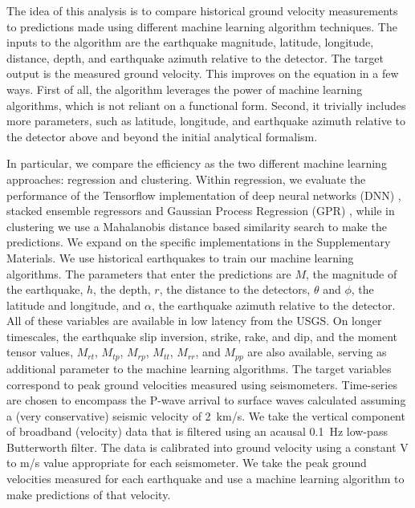 \documentclass[preprint, aps, showpacs]{revtex4-1}
\begin{document}
The idea of this analysis is to compare historical ground velocity measurements to predictions made using different machine learning algorithm techniques. 
The inputs to the algorithm are the earthquake magnitude, latitude, longitude, distance, depth, and earthquake azimuth relative to the detector. 
The target output is the measured ground velocity.
This improves on the equation in a few ways.
First of all, the algorithm leverages the power of machine learning algorithms, which is not reliant on a functional form.
Second, it trivially includes more parameters, such as latitude, longitude, and earthquake azimuth relative to the detector above and beyond the initial analytical formalism. 

In particular, we compare the efficiency as the two different machine learning approaches: regression and clustering. Within regression, we evaluate the performance of the Tensorflow implementation of deep neural networks (DNN) \citep{Abadi:2016:TSL:3026877.3026899}, stacked ensemble regressors \citep{wolpert1992stacked,van2007super} and Gaussian Process Regression (GPR) \citep{rasmussen2006gaussian}, while in clustering we use a Mahalanobis distance \citep{Mahalanobis} based similarity search to make the predictions.
We expand on the specific implementations in the Supplementary Materials.
We use historical earthquakes to train our machine learning algorithms. The parameters that enter the predictions are $M$, the magnitude of the earthquake, $h$, the depth, $r$, the distance to the detectors, $\theta$ and $\phi$, the latitude and longitude, and $\alpha$, the earthquake azimuth relative to the detector.
All of these variables are available in low latency from the USGS.
On longer timescales, the earthquake slip inversion, strike, rake, and dip, and the moment tensor values, $M_{rt}$, $M_{tp}$, $M_{rp}$, $M_{tt}$, $M_{rr}$, and $M_{pp}$ are also available, serving as additional parameter to the machine learning algorithms. The target variables correspond to peak ground velocities measured using seismometers.
Time-series are chosen to encompass the P-wave arrival to surface waves calculated assuming a (very conservative) seismic velocity of 2\, km/s.
We take the vertical component of broadband (velocity) data that is filtered using an acausal 0.1\, Hz low-pass Butterworth filter.
The data is calibrated into ground velocity using a constant V to m/s value appropriate for each seismometer.
We take the peak ground velocities measured for each earthquake and use a machine learning algorithm to make predictions of that velocity.
\end{document}
